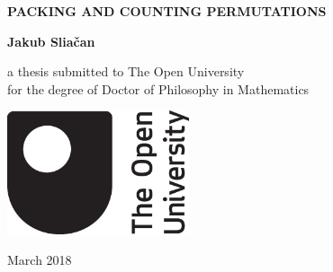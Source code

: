 \begin{titlepage}
    \begin{center}
        \vspace*{1cm}
        
        \Huge
        \textbf{PACKING AND COUNTING PERMUTATIONS}
        
        \vspace{1.5cm}
        
        \textbf{Jakub Slia\v{c}an}
        
        \vfill
        
        \Large a thesis submitted to The Open University\\
        for the degree of Doctor of Philosophy in Mathematics
        
        \vspace{0.8cm}
        
        \includegraphics[width=0.4\textwidth]{figs/oulogo.jpg}
        
        \vspace{0.8cm}

        \Large
        March 2018
        
    \end{center}
\end{titlepage}